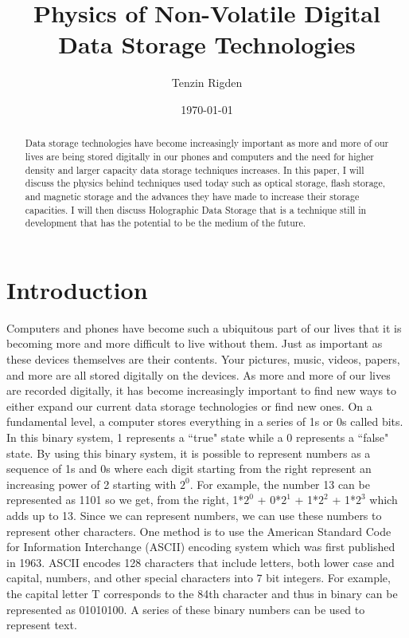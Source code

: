 \documentclass[ notitlepage, numerical, 11pt]{revtex4-1} %
\begin{document}
\title{Physics of Non-Volatile Digital Data Storage Technologies}
\author{Tenzin Rigden}
\date{\today}
\begin{abstract}
Data storage technologies have become increasingly important as more and more of our lives are being stored digitally in our phones and computers and the need for higher density and larger capacity data storage techniques increases. In this paper, I will discuss the physics behind techniques used today such as optical storage, flash storage, and magnetic storage and the advances they have made to increase their storage capacities. I will then discuss Holographic Data Storage that is a technique still in development that has the potential to be the medium of the future.

\end{abstract}

\maketitle
\section{Introduction}
Computers and phones have become such a ubiquitous part of our lives that it is becoming more and more difficult to live without them. Just as important as these devices themselves are their contents. Your pictures, music, videos, papers, and more are all stored digitally on the devices. As more and more of our lives are recorded digitally, it has become increasingly important to find new ways to either expand our current data storage technologies or find new ones. On a fundamental level, a computer stores everything in a series of 1s or 0s called bits. In this binary system, 1 represents a ``true" state while a 0 represents a ``false" state. By using this binary system, it is possible to represent numbers as a sequence of 1s and 0s where each digit starting from the right represent an increasing power of 2 starting with $2^0$. For example, the number 13 can be represented as 1101 so we get, from the right, 1*$2^0$ + 0*$2^1$ + 1*$2^2$ + 1*$2^3$ which adds up to 13. Since we can represent numbers, we can use these numbers to represent other characters. One method is to use the American Standard Code for Information Interchange (ASCII) encoding system which was first published in 1963. ASCII encodes 128 characters that include letters, both lower case and capital, numbers, and other special characters into 7 bit integers. For example, the capital letter T corresponds to the 84th character and thus in binary can be represented as 01010100. A series of these binary numbers can be used to represent text.
\end{document}
